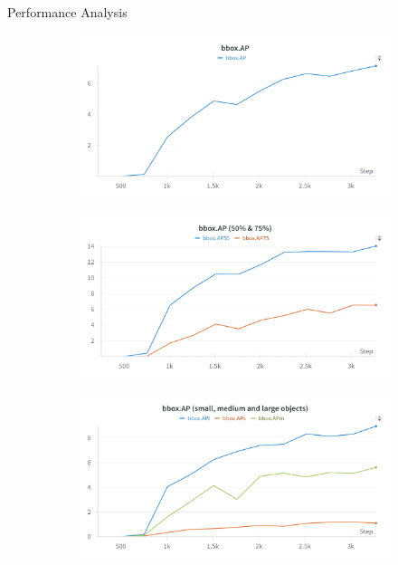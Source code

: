 \begin{subsectionframemod}{Performance Analysis}

\begin{figure}[h]
        \centering
        \begin{subfigure}{0.3\textwidth}
            \includegraphics[width=\textwidth]{Figures/lora1.png}
        \end{subfigure}
        \begin{subfigure}{0.3\textwidth}
            \includegraphics[width=\textwidth]{Figures/lora2.png}
        \end{subfigure}
        \begin{subfigure}{0.3\textwidth}
            \includegraphics[width=\textwidth]{Figures/lora3.png}

\end{subfigure}
\end{figure}
\end{subsectionframemod}
